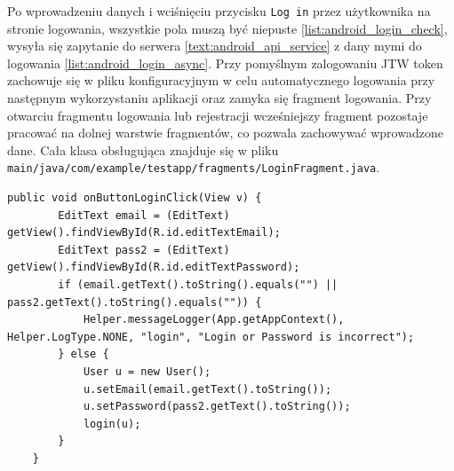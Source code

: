 Po \label{text:login} wprowadzeniu danych i wciśnięciu przycisku \texttt{Log in} przez użytkownika na stronie logowania, wszystkie pola muszą być niepuste \ref{list:android_login_check}, wysyła się zapytanie do serwera \ref{text:android_api_service} z dany mymi do logowania \ref{list:android_login_async}.
Przy pomyślnym zalogowaniu JTW token zachowuje się w pliku konfiguracyjnym w celu automatycznego logowania przy następnym wykorzystaniu aplikacji oraz zamyka się fragment logowania. Przy otwarciu fragmentu logowania lub rejestracji wcześniejszy fragment pozostaje pracować na dolnej warstwie fragmentów, co pozwala zachowywać wprowadzone dane.
Cała klasa obsługująca znajduje się w pliku \texttt{main/java/com/example/testapp/fragments/LoginFragment.java}.
\begin{lstlisting}[label=list:android_login_check,caption=Obsługa przycisku login,basicstyle=\tiny\ttfamily]
    public void onButtonLoginClick(View v) {
        EditText email = (EditText) getView().findViewById(R.id.editTextEmail);
        EditText pass2 = (EditText) getView().findViewById(R.id.editTextPassword);
        if (email.getText().toString().equals("") || pass2.getText().toString().equals("")) {
            Helper.messageLogger(App.getAppContext(), Helper.LogType.NONE, "login", "Login or Password is incorrect");
        } else {
            User u = new User();
            u.setEmail(email.getText().toString());
            u.setPassword(pass2.getText().toString());
            login(u);
        }
    }
\end{lstlisting}
